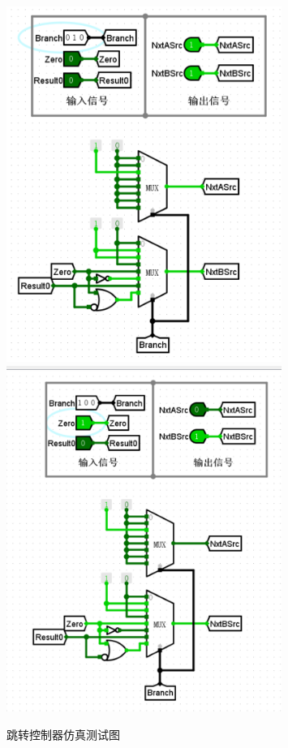 \documentclass{article}
\begin{document}
    \begin{figure}[H]
        \centering
        \includegraphics[width=0.8\textwidth]{5.5.3.png}
        \includegraphics[width=0.8\textwidth]{5.5.4.png}    
        \caption{跳转控制器仿真测试图}
    \end{figure}
\end{document}

